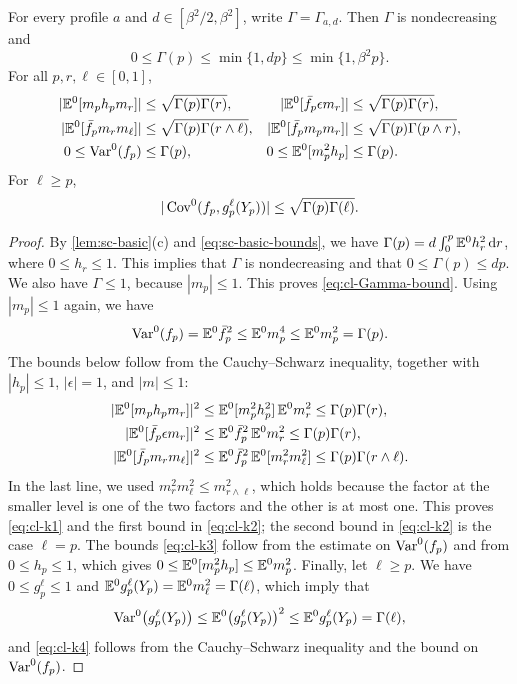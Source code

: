 \begin{lemma}\label{lem:cl-scalar}
For every profile $a$ and $d\in[\beta^2/2,\beta^2]$, write
$\Gamma=\Gamma_{a,d}$. Then $\Gamma$ is nondecreasing and
\begin{equation}\label{eq:cl-Gamma-bound}
 0\le\Gamma(p)\le\min\{1,dp\}\le\min\{1,\beta^2p\}.
\end{equation}
For all $p,r,\ell\in[0,1]$,
\begin{align}
 |\mathbb E^0[m_ph_pm_r]|&\le\sqrt{\Gamma(p)\Gamma(r)},&
 |\mathbb E^0[\bar f_p\epsilon m_r]|&\le\sqrt{\Gamma(p)\Gamma(r)},
                                                        \label{eq:cl-k1}\\
 |\mathbb E^0[\bar f_pm_rm_\ell]|&\le\sqrt{\Gamma(p)\Gamma(r\wedge\ell)},&
 |\mathbb E^0[\bar f_pm_pm_r]|&\le\sqrt{\Gamma(p)\Gamma(p\wedge r)},
                                                        \label{eq:cl-k2}\\
 0\le\operatorname{Var}^0(f_p)&\le\Gamma(p),&
 0\le\mathbb E^0[m_p^2h_p]&\le\Gamma(p).                       \label{eq:cl-k3}
\end{align}
For $\ell\ge p$,
\begin{equation}\label{eq:cl-k4}
 |\operatorname{Cov}^0(f_p,g_p^\ell(Y_p))|\le\sqrt{\Gamma(p)\Gamma(\ell)}.
\end{equation}
\end{lemma}

\begin{proof}
By \cref{lem:sc-basic}(c) and \eqref{eq:sc-basic-bounds}, we have
$\Gamma(p)=d\int_0^p\mathbb E^0h_r^2\,\mathrm d r$, where $0\le h_r\le1$. This implies
that $\Gamma$ is nondecreasing and that $0\le\Gamma(p)\le dp$. We also
have $\Gamma\le1$, because $|m_p|\le1$. This proves \eqref{eq:cl-Gamma-bound}. Using $|m_p|\le1$
again, we have
\[
 \operatorname{Var}^0(f_p)=\mathbb E^0\bar f_p^2\le\mathbb E^0m_p^4\le\mathbb E^0m_p^2=\Gamma(p).
\]
The bounds below follow from the Cauchy--Schwarz inequality, together
with $|h_p|\le1$, $|\epsilon|=1$, and $|m|\le1$:
\[
 \begin{aligned}
 |\mathbb E^0[m_ph_pm_r]|^2
 &\le\mathbb E^0[m_p^2h_p^2]\,\mathbb E^0m_r^2\le\Gamma(p)\Gamma(r),\\
 |\mathbb E^0[\bar f_p\epsilon m_r]|^2
 &\le\mathbb E^0\bar f_p^2\,\mathbb E^0m_r^2\le\Gamma(p)\Gamma(r),\\
 |\mathbb E^0[\bar f_pm_rm_\ell]|^2
 &\le\mathbb E^0\bar f_p^2\,\mathbb E^0[m_r^2m_\ell^2]\le\Gamma(p)\Gamma(r\wedge\ell).
 \end{aligned}
\]
In the last line, we used $m_r^2m_\ell^2\le m_{r\wedge\ell}^2$, which
holds because the factor at the smaller level is one of the two factors
and the other is at most one. This proves \eqref{eq:cl-k1} and the first
bound in \eqref{eq:cl-k2}; the second bound in \eqref{eq:cl-k2} is the
case $\ell=p$. The bounds \eqref{eq:cl-k3} follow from the estimate on
$\operatorname{Var}^0(f_p)$ and from $0\le h_p\le1$, which gives
$0\le\mathbb E^0[m_p^2h_p]\le\mathbb E^0m_p^2$. Finally, let $\ell\ge p$. We have
$0\le g_p^\ell\le1$ and $\mathbb E^0g_p^\ell(Y_p)=\mathbb E^0m_\ell^2=\Gamma(\ell)$,
which imply that
\[
 \operatorname{Var}^0\bigl(g_p^\ell(Y_p)\bigr)\le\mathbb E^0\bigl(g_p^\ell(Y_p)\bigr)^2
 \le\mathbb E^0g_p^\ell(Y_p)=\Gamma(\ell),
\]
and \eqref{eq:cl-k4} follows from the Cauchy--Schwarz inequality and
the bound on $\operatorname{Var}^0(f_p)$.
\end{proof}

